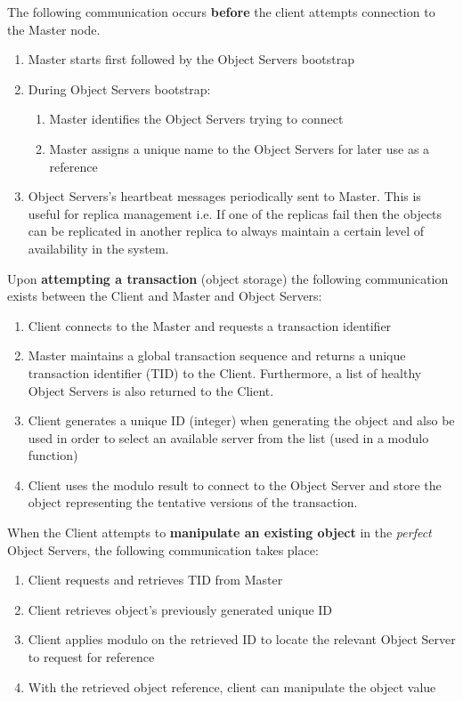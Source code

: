 \documentclass[times, 10pt,twocolumn]{article}
\begin{document}
The following communication occurs {\bf before} the client attempts connection 
to the Master node.
\begin{enumerate}
\item Master starts first followed by the Object Servers bootstrap
\item During Object Servers bootstrap:
\begin{enumerate}
\item Master identifies the Object Servers trying to connect
\item Master assigns a unique name to the Object Servers for later use as a reference
\end{enumerate}
\item Object Servers's heartbeat messages periodically sent to Master. This is useful for replica management i.e. If one of the replicas fail then the objects can be replicated in another replica to always maintain a certain level of availability in the system.
\end{enumerate}

Upon {\bf attempting a transaction} (object storage) the following communication exists between the Client and Master and Object Servers: 

\begin{enumerate}
\item Client connects to the Master and requests a transaction identifier 
\item Master maintains a global transaction sequence and returns a unique transaction identifier (TID) to the Client. Furthermore, a list of healthy Object Servers is also returned to the Client. 
\item Client generates a unique ID (integer) when generating the object and also be used in order to select an available server from the list (used in a modulo function)
\item Client uses the modulo result to connect to the Object Server and store the object representing the tentative versions of the transaction.
\end{enumerate}

When the Client attempts to {\bf manipulate an existing object} in the {\it perfect} Object Servers, the following communication takes place:
\begin{enumerate}
\item Client requests and retrieves TID from Master
\item Client retrieves object's previously generated unique ID
\item Client applies modulo on the retrieved ID to locate the relevant Object Server to request for reference
\item With the retrieved object reference, client can manipulate the object value
\end{enumerate}
\end{document}
